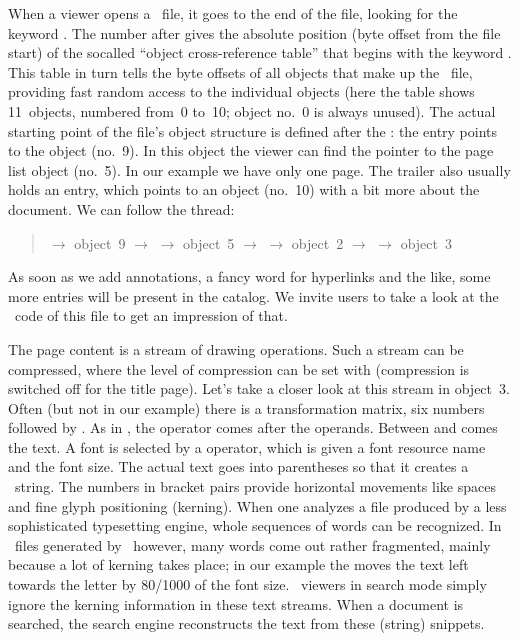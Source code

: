 \documentclass{pdftexmanual}
\begin{document}
When a viewer opens a \PDF\ file, it goes to the end of the file,
looking for the keyword . The number after
 gives the absolute position (byte offset from the file
start) of the so\hyph called ``object cross-reference table'' that
begins with the keyword . This table in turn tells the byte
offsets of all objects that make up the \PDF\ file, providing fast
random access to the individual objects (here the  table
shows 11~objects, numbered from~0 to~10; object no.~0 is always unused).
The actual starting point of the file's object structure is defined
after the : the  entry points to the
 object (no.~9). In this object the viewer can find the
pointer  to the page list object (no.~5). In our example we
have only one page. The trailer also usually holds an 
entry, which points to an object (no.~10) with a bit more about the
document. We can follow the thread:

\begin{quote}
     $\longrightarrow$ object~9 $\longrightarrow$
    $\longrightarrow$ object~5 $\longrightarrow$
     $\longrightarrow$ object~2 $\longrightarrow$
 $\longrightarrow$ object~3
\end{quote}

As soon as we add annotations, a fancy word for hyperlinks and the like,
some more entries will be present in the catalog. We invite users to
take a look at the \PDF\ code of this file to get an impression of that.

The page content is a stream of drawing operations. Such a stream can be
compressed, where the level of compression can be set with
 (compression is switched off for the title page).
Let's take a closer look at this stream in object~3. Often (but not in
our example) there is a transformation matrix, six numbers followed by
. As in \POSTSCRIPT, the operator comes after the operands.
Between  and  comes the text. A font is selected by a
 operator, which is given a font resource name  and
the font size. The actual text goes into parentheses \type{()} so that
it creates a \POSTSCRIPT\ string. The numbers in bracket pairs provide
horizontal movements like spaces and fine glyph positioning (kerning).
When one analyzes a file produced by a less sophisticated typesetting
engine, whole sequences of words can be recognized. In \PDF\ files
generated by \PDFTEX\ however, many words come out rather fragmented,
mainly because a lot of kerning takes place; in our example the
 moves the text  left towards the letter
 by 80/1000 of the font size. \PDF\ viewers in search mode
simply ignore the kerning information in these text streams. When a
document is searched, the search engine reconstructs the text from these
(string) snippets.
\end{document}
